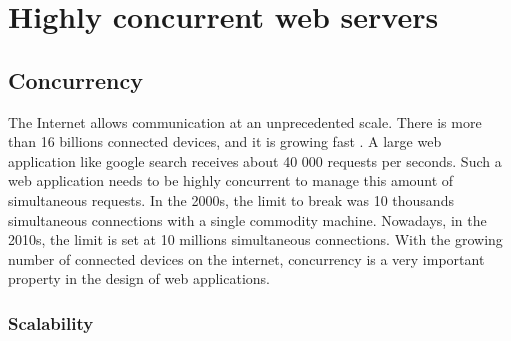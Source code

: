 \section{Highly concurrent web servers} \label{chapter2:highly-concurrent-web-servers}



\subsection{Concurrency}

The Internet allows communication at an unprecedented scale.
There is more than 16 billions connected devices, and it is growing fast \cite{Hilbert2011}.
A large web application like google search receives about 40 000 requests per seconds.
Such a web application needs to be highly concurrent to manage this amount of simultaneous requests.
In the 2000s, the limit to break was 10 thousands simultaneous connections with a single commodity machine.
Nowadays, in the 2010s, the limit is set at 10 millions simultaneous connections.
With the growing number of connected devices on the internet, concurrency is a very important property in the design of web applications.

\subsubsection{Scalability}

